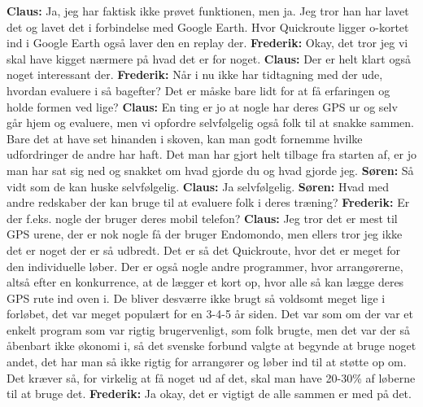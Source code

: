 \textbf{Claus:} Ja, jeg har faktisk ikke prøvet funktionen, men ja. Jeg tror han har lavet det og lavet det i forbindelse med Google Earth. Hvor Quickroute ligger o-kortet ind i Google Earth også laver den en replay der. \newline
\textbf{Frederik:} Okay, det tror jeg vi skal have kigget nærmere på hvad det er for noget. \newline
\textbf{Claus:} Der er helt klart også noget interessant der.\newline
\textbf{Frederik:} Når i nu ikke har tidtagning med der ude, hvordan evaluere i så bagefter? Det er måske bare lidt for at få erfaringen og holde formen ved lige?\newline
\textbf{Claus:} En ting er jo at nogle har deres GPS ur og selv går hjem og evaluere, men vi opfordre selvfølgelig også folk til at snakke sammen. Bare det at have set hinanden i skoven, kan man godt fornemme hvilke udfordringer de andre har haft. Det man har gjort helt tilbage fra starten af, er jo man har sat sig ned og snakket om hvad gjorde du og hvad gjorde jeg. \newline
\textbf{Søren:} Så vidt som de kan huske selvfølgelig.\newline
\textbf{Claus:} Ja selvfølgelig. \newline
\textbf{Søren:} Hvad med andre redskaber der kan bruge til at evaluere folk i deres træning?\newline
\textbf{Frederik:} Er der f.eks. nogle der bruger deres mobil telefon?\newline
\textbf{Claus:} Jeg tror det er mest til GPS urene, der er nok nogle få der bruger Endomondo, men ellers tror jeg ikke det er noget der er så udbredt. Det er så det Quickroute, hvor det er meget for den individuelle løber. Der er også nogle andre programmer, hvor arrangørerne, altså efter en konkurrence, at de lægger et kort op, hvor alle så kan lægge deres GPS rute ind oven i. De bliver desværre ikke brugt så voldsomt meget lige i forløbet, det var meget populært for en 3-4-5 år siden. Det var som om der var et enkelt program som var rigtig brugervenligt, som folk brugte, men det var der så åbenbart ikke økonomi i, så det svenske forbund valgte at begynde at bruge noget andet, det har man så ikke rigtig for arrangører og løber ind til at støtte op om. Det kræver så, for virkelig at få noget ud af det, skal man have 20-30\% af løberne til at bruge det. \newline
\textbf{Frederik:} Ja okay, det er vigtigt de alle sammen er med på det. \newline
